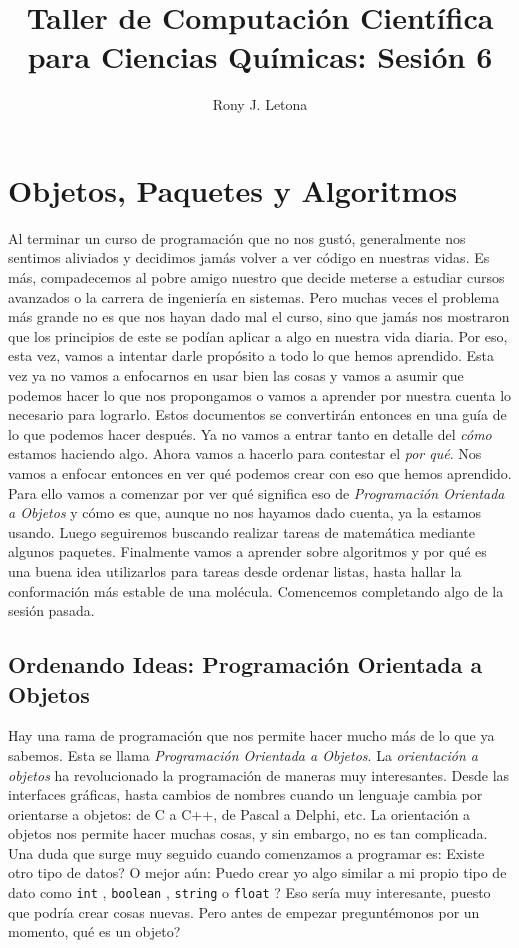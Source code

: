 \documentclass[10pt,letterpaper]{article}
\author{Rony J. Letona}
\title{Taller de Computaci\'on Cient\'ifica para Ciencias Qu\'imicas: Sesi\'on 6}
\newcommand{\inlinecode}[1]{
\colorbox{light-gray}{\texttt{#1}}
}
\begin{document}
\maketitle

\section{Objetos, Paquetes y Algoritmos}
Al terminar un curso de programaci\'on que no nos gust\'o, generalmente nos sentimos aliviados y decidimos jam\'as volver a ver c\'odigo en nuestras vidas. Es m\'as, compadecemos al pobre amigo nuestro que decide meterse a estudiar cursos avanzados o la carrera de ingenier\'ia en sistemas. Pero muchas veces el problema m\'as grande no es que nos hayan dado mal el curso, sino que jam\'as nos mostraron que los principios de este se pod\'ian aplicar a algo en nuestra vida diaria. Por eso, esta vez, vamos a intentar darle prop\'osito a todo lo que hemos aprendido. Esta vez ya no vamos a enfocarnos en usar bien las cosas y vamos a asumir que podemos hacer lo que nos propongamos o vamos a aprender por nuestra cuenta lo necesario para lograrlo. Estos documentos se convertir\'an entonces en una gu\'ia de lo que podemos hacer despu\'es. Ya no vamos a entrar tanto en detalle del \emph{c\'omo} estamos haciendo algo. Ahora vamos a hacerlo para contestar el \emph{por qu\'e}. Nos vamos a enfocar entonces en ver qu\'e podemos crear con eso que hemos aprendido. Para ello vamos a comenzar por ver qu\'e significa eso de \emph{Programaci\'on Orientada a Objetos} y c\'omo es que, aunque no nos hayamos dado cuenta, ya la estamos usando. Luego seguiremos buscando realizar tareas de matem\'atica mediante algunos paquetes. Finalmente vamos a aprender sobre algoritmos y por qu\'e es una buena idea utilizarlos para tareas desde ordenar listas, hasta hallar la conformaci\'on m\'as estable de una mol\'ecula. Comencemos completando algo de la sesi\'on pasada.

\subsection{Ordenando Ideas: Programaci\'on Orientada a Objetos}
Hay una rama de programaci\'on que nos permite hacer mucho m\'as de lo que ya sabemos. Esta se llama \emph{Programaci\'on Orientada a Objetos}. La \emph{orientaci\'on a objetos} ha revolucionado la programaci\'on de maneras muy interesantes. Desde las interfaces gr\'aficas, hasta cambios de nombres cuando un lenguaje cambia por orientarse a objetos: de C a C++, de Pascal a Delphi, etc. La orientaci\'on a objetos nos permite hacer muchas cosas, y sin embargo, no es tan complicada. Una duda que surge muy seguido cuando comenzamos a programar es: Existe otro tipo de datos? O mejor a\'un: Puedo crear yo algo similar a mi propio tipo de dato como \inlinecode{int}, \inlinecode{boolean}, \inlinecode{string} o \inlinecode{float}? Eso ser\'ia muy interesante, puesto que podr\'ia crear cosas nuevas. Pero antes de empezar pregunt\'emonos por un momento, qu\'e es un objeto?\\
\end{document}

